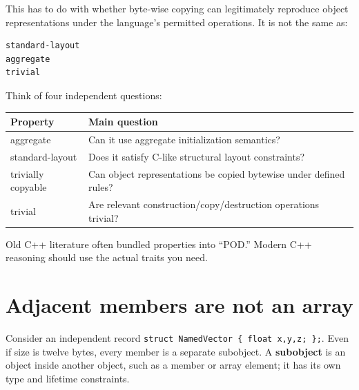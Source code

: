 This has to do with whether byte-wise copying can legitimately reproduce object representations under the language's permitted operations. It is not the same as:

\begin{verbatim}
standard-layout
aggregate
trivial
\end{verbatim}

Think of four independent questions:

{\def\LTcaptype{none} %
\begin{longtable}[]{@{}
  >{\raggedright\arraybackslash}p{}
  >{\raggedright\arraybackslash}p{}@{}}
\toprule\noalign{}
\begin{minipage}[b]{\linewidth}\raggedright
Property
\end{minipage} & \begin{minipage}[b]{\linewidth}\raggedright
Main question
\end{minipage} \\
\midrule\noalign{}
\endhead
\bottomrule\noalign{}
\endlastfoot
aggregate & Can it use aggregate initialization semantics? \\
standard-layout & Does it satisfy C-like structural layout constraints? \\
trivially copyable & Can object representations be copied bytewise under defined rules? \\
trivial & Are relevant construction/copy/destruction operations trivial? \\
\end{longtable}
}

Old C++ literature often bundled properties into ``POD.'' Modern C++ reasoning should use the actual traits you need.

\section{Adjacent members are not an array}\label{01-foundations-i-ch003-adjacent-members-are-not-an-array}

\hypertarget{01-foundations-i-ch003-adjacent-members-are-not-an-array}{}

Consider an independent record \texttt{struct\ NamedVector\ \{\ float\ x,y,z;\ \};}. Even if size is twelve bytes, every member is a separate subobject. A \textbf{subobject} is an object inside another object, such as a member or array element; it has its own type and lifetime constraints.


